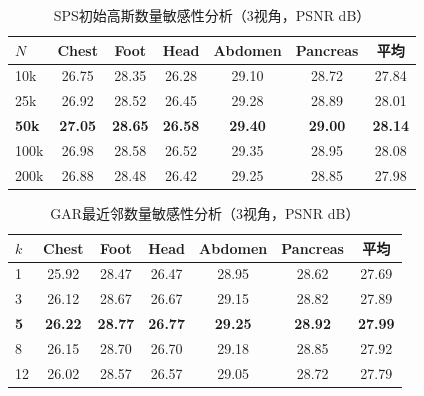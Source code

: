 \begin{table}[htbp]
    \centering
    \caption{SPS初始高斯数量敏感性分析（3视角，PSNR dB）}
    \label{tab:spags_sps_hyper}
    \begin{tabular}{lcccccc}
        \toprule
        $N$ & Chest & Foot & Head & Abdomen & Pancreas & 平均 \\
        \midrule
        10k & 26.75 & 28.35 & 26.28 & 29.10 & 28.72 & 27.84 \\
        25k & 26.92 & 28.52 & 26.45 & 29.28 & 28.89 & 28.01 \\
        \textbf{50k} & \textbf{27.05} & \textbf{28.65} & \textbf{26.58} & \textbf{29.40} & \textbf{29.00} & \textbf{28.14} \\
        100k & 26.98 & 28.58 & 26.52 & 29.35 & 28.95 & 28.08 \\
        200k & 26.88 & 28.48 & 26.42 & 29.25 & 28.85 & 27.98 \\
        \bottomrule
    \end{tabular}
\end{table}

\begin{table}[htbp]
    \centering
    \caption{GAR最近邻数量敏感性分析（3视角，PSNR dB）}
    \label{tab:spags_gar_hyper}
    \begin{tabular}{lcccccc}
        \toprule
        $k$ & Chest & Foot & Head & Abdomen & Pancreas & 平均 \\
        \midrule
        1 & 25.92 & 28.47 & 26.47 & 28.95 & 28.62 & 27.69 \\
        3 & 26.12 & 28.67 & 26.67 & 29.15 & 28.82 & 27.89 \\
        \textbf{5} & \textbf{26.22} & \textbf{28.77} & \textbf{26.77} & \textbf{29.25} & \textbf{28.92} & \textbf{27.99} \\
        8 & 26.15 & 28.70 & 26.70 & 29.18 & 28.85 & 27.92 \\
        12 & 26.02 & 28.57 & 26.57 & 29.05 & 28.72 & 27.79 \\
        \bottomrule
    \end{tabular}
\end{table}

